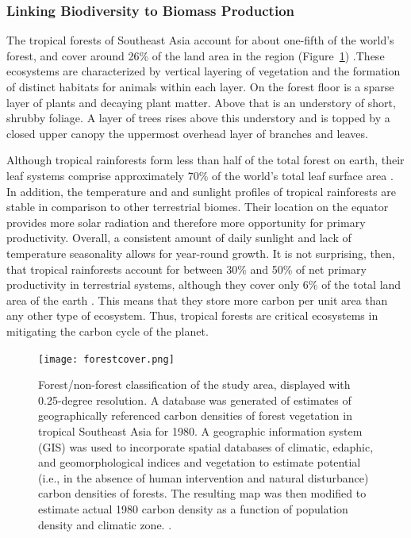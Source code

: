 \subsubsection{Linking Biodiversity to Biomass Production}
  
The tropical forests of Southeast Asia account for about one-fifth of the world's forest, and cover around 26\% of the land area in the region (Figure~\ref{fig:SE_forests}) \citep{brown2003state}.These ecosystems are characterized by vertical layering of vegetation and the formation of distinct habitats for animals within each layer. On the forest floor is a sparse layer of plants and decaying plant matter. Above that is an understory of short, shrubby foliage. A layer of trees rises above this understory and is topped by a closed upper canopy the uppermost overhead layer of branches and leaves.
  
Although tropical rainforests form less than half of the total forest on earth, their leaf systems comprise approximately 70\% of the world's total leaf surface area \citep{gower1999direct}. In addition, the temperature and and sunlight profiles of tropical rainforests are stable in comparison to other terrestrial biomes. Their location on the equator provides more solar radiation and therefore more opportunity for primary productivity. Overall, a consistent amount of daily sunlight and lack of temperature seasonality allows for year-round growth.   It is not surprising, then, that tropical rainforests account for between 30\% and 50\% of net primary productivity in terrestrial systems, although they cover only 6\% of the total land area of the earth \citep{houghton2005aboveground}. This means that they store more carbon per unit area than any other type of ecosystem. Thus, tropical forests are critical ecosystems in mitigating the carbon cycle of the planet. 
  
 \begin{figure}[ht]
    \centering
        \texttt{[image: forestcover.png]}
        \caption{Forest/non-forest classification of the study area, displayed with 0.25-degree resolution. A database was generated of estimates of geographically referenced carbon densities of forest vegetation in tropical Southeast Asia for 1980. A geographic information system (GIS) was used to incorporate spatial databases of climatic, edaphic, and geomorphological indices and vegetation to estimate potential (i.e., in the absence of human intervention and natural disturbance) carbon densities of forests. The resulting map was then modified to estimate actual 1980 carbon density as a function of population density and climatic zone. \citep{brown1991biomass}.}
			\label{fig:SE_forests}
    \end{figure}


